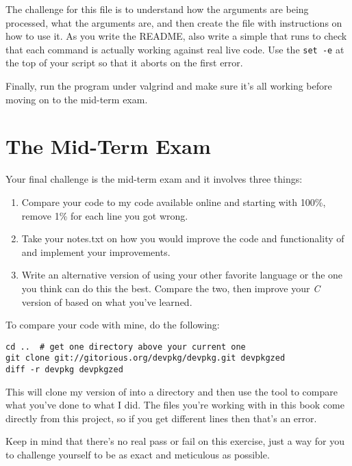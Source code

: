 The challenge for this file is to understand how the arguments are
being processed, what the arguments are, and then create the 
file with instructions on how to use it.  As you write the README, also
write a simple  that runs  to check that
each command is actually working against real live code.  Use the \verb|set -e|
at the top of your script so that it aborts on the first error.

Finally, run the program under valgrind and make sure it's all working
before moving on to the mid-term exam.

\section{The Mid-Term Exam}

Your final challenge is the mid-term exam and it involves three things:

\begin{enumerate}
\item Compare your code to my code available online and starting with 100\%, 
    remove 1\% for each line you got wrong.
\item Take your notes.txt on how you would improve the code and functionality
    of  and implement your improvements.
\item Write an alternative version of  using your other 
    favorite language or the one you think can do this the best.  Compare
    the two, then improve your \emph{C} version of  based on what
    you've learned.
\end{enumerate}

To compare your code with mine, do the following:

\begin{lstlisting}
cd ..  # get one directory above your current one
git clone git://gitorious.org/devpkg/devpkg.git devpkgzed
diff -r devpkg devpkgzed
\end{lstlisting}

This will clone my version of  into a directory
 and then use the tool  to compare
what you've done to what I did.  The files you're working with in
this book come directly from this project, so if you get different
lines then that's an error.

Keep in mind that there's no real pass or fail on this exercise, just
a way for you to challenge yourself to be as exact and meticulous as
possible.

